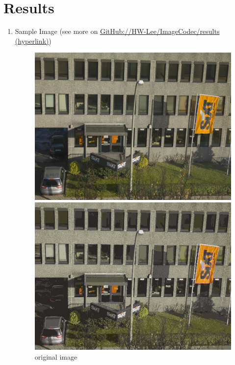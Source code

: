 \documentclass[12pt]{article}
\begin{document}
\section*{Results}
\vspace{-20pt}
\noindent\makebox[\linewidth]{\rule{\textwidth}{0.4pt}}

\begin{enumerate}
	\item Sample Image (see more on \href{https://github.com/HW-Lee/ImageCodec/tree/master/results}{GitHub://HW-Lee/ImageCodec/results (hyperlink)})
		\begin{figure}[ht]
			\begin{minipage}[c]{0.48\linewidth}
				\centering
				\includegraphics[scale=.23]{./res/sample_image/original.png}
				\caption*{original image}
				\vspace{10pt}
				\includegraphics[scale=.23]{./res/sample_image/decompressed1.png}

\end{minipage}
\end{figure}
\end{enumerate}
\end{document}
